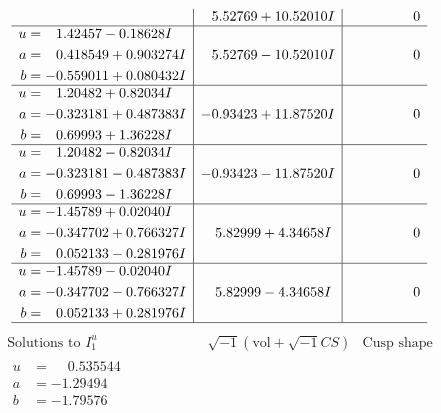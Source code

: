 \documentclass[1p]{elsarticle_modified}
\theoremstyle{definition}
\newcommand{\I}{\sqrt{-1}}
\begin{document}
$$\begin{array}{c|c|c}
 & \phantom{-}5.52769 + 10.52010 I & \phantom{-0.000000 } 0 \\ \hline\begin{aligned}
u &= \phantom{-}1.42457 - 0.18628 I \\
a &= \phantom{-}0.418549 + 0.903274 I \\
b &= -0.559011 + 0.080432 I\end{aligned}
 & \phantom{-}5.52769 - 10.52010 I & \phantom{-0.000000 } 0 \\ \hline\begin{aligned}
u &= \phantom{-}1.20482 + 0.82034 I \\
a &= -0.323181 + 0.487383 I \\
b &= \phantom{-}0.69993 + 1.36228 I\end{aligned}
 & -0.93423 + 11.87520 I & \phantom{-0.000000 } 0 \\ \hline\begin{aligned}
u &= \phantom{-}1.20482 - 0.82034 I \\
a &= -0.323181 - 0.487383 I \\
b &= \phantom{-}0.69993 - 1.36228 I\end{aligned}
 & -0.93423 - 11.87520 I & \phantom{-0.000000 } 0 \\ \hline\begin{aligned}
u &= -1.45789 + 0.02040 I \\
a &= -0.347702 + 0.766327 I \\
b &= \phantom{-}0.052133 - 0.281976 I\end{aligned}
 & \phantom{-}5.82999 + 4.34658 I & \phantom{-0.000000 } 0 \\ \hline\begin{aligned}
u &= -1.45789 - 0.02040 I \\
a &= -0.347702 - 0.766327 I \\
b &= \phantom{-}0.052133 + 0.281976 I\end{aligned}
 & \phantom{-}5.82999 - 4.34658 I & \phantom{-0.000000 } 0\\
 \hline 
 \end{array}$$\newpage$$\begin{array}{c|c|c}  
\text{Solutions to }I^u_{1}& \I (\text{vol} + \sqrt{-1}CS) & \text{Cusp shape}\\
 \hline 
\begin{aligned}
u &= \phantom{-}0.535544\phantom{ +0.000000I} \\
a &= -1.29494\phantom{ +0.000000I} \\
b &= -1.79576\phantom{ +0.000000I}\end{aligned}

\end{array}$$
\end{document}
